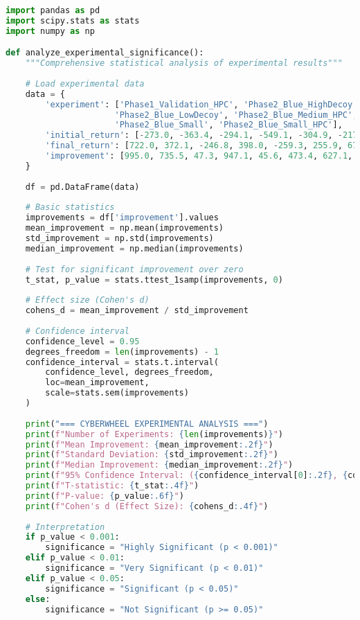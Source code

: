 \documentclass[12pt,a4paper]{article}
\begin{document}
\begin{lstlisting}[language=Python, caption=Statistical Analysis of Results]
import pandas as pd
import scipy.stats as stats
import numpy as np

def analyze_experimental_significance():
    """Comprehensive statistical analysis of experimental results"""
    
    # Load experimental data
    data = {
        'experiment': ['Phase1_Validation_HPC', 'Phase2_Blue_HighDecoy', 'Phase2_Blue_HighDecoy_HPC',
                      'Phase2_Blue_LowDecoy', 'Phase2_Blue_Medium_HPC', 'Phase2_Blue_PerfDetection_HPC',
                      'Phase2_Blue_Small', 'Phase2_Blue_Small_HPC'],
        'initial_return': [-273.0, -363.4, -294.1, -549.1, -304.9, -217.5, 43.2, -235.8],
        'final_return': [722.0, 372.1, -246.8, 398.0, -259.3, 255.9, 670.3, -80.3],
        'improvement': [995.0, 735.5, 47.3, 947.1, 45.6, 473.4, 627.1, 155.5]
    }
    
    df = pd.DataFrame(data)
    
    # Basic statistics
    improvements = df['improvement'].values
    mean_improvement = np.mean(improvements)
    std_improvement = np.std(improvements)
    median_improvement = np.median(improvements)
    
    # Test for significant improvement over zero
    t_stat, p_value = stats.ttest_1samp(improvements, 0)
    
    # Effect size (Cohen's d)
    cohens_d = mean_improvement / std_improvement
    
    # Confidence interval
    confidence_level = 0.95
    degrees_freedom = len(improvements) - 1
    confidence_interval = stats.t.interval(
        confidence_level, degrees_freedom, 
        loc=mean_improvement, 
        scale=stats.sem(improvements)
    )
    
    print("=== CYBERWHEEL EXPERIMENTAL ANALYSIS ===")
    print(f"Number of Experiments: {len(improvements)}")
    print(f"Mean Improvement: {mean_improvement:.2f}")
    print(f"Standard Deviation: {std_improvement:.2f}")
    print(f"Median Improvement: {median_improvement:.2f}")
    print(f"95% Confidence Interval: ({confidence_interval[0]:.2f}, {confidence_interval[1]:.2f})")
    print(f"T-statistic: {t_stat:.4f}")
    print(f"P-value: {p_value:.6f}")
    print(f"Cohen's d (Effect Size): {cohens_d:.4f}")
    
    # Interpretation
    if p_value < 0.001:
        significance = "Highly Significant (p < 0.001)"
    elif p_value < 0.01:
        significance = "Very Significant (p < 0.01)"
    elif p_value < 0.05:
        significance = "Significant (p < 0.05)"
    else:
        significance = "Not Significant (p >= 0.05)"
    

\end{lstlisting}
\end{document}
